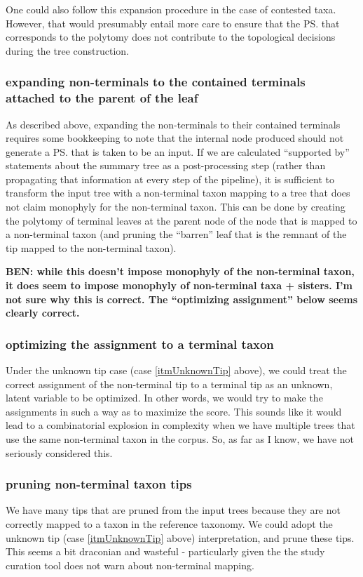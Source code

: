 \documentclass[11pt]{article}
\begin{document}
One could also follow this expansion procedure in the case of contested taxa.
However, that would presumably entail more care to ensure that the \ps that corresponds
    to the polytomy does not contribute to the topological decisions during the 
    tree construction.

\subsubsection{expanding non-terminals to the contained terminals attached to the parent of the leaf}\label{expandNonTermPar}
As described above, expanding the non-terminals to their contained terminals requires 
    some bookkeeping to note that the internal node produced should not generate a \ps that
    is taken to be an input.
If we are calculated ``supported by'' statements about the summary tree as a post-processing step (rather
    than propagating that information at every step of the pipeline), it is sufficient
    to transform the input tree with a non-terminal taxon mapping to a tree that does not
    claim monophyly for the non-terminal taxon.
This can be done by creating the polytomy of terminal leaves at the parent node of the node that is
    mapped to a non-terminal taxon (and pruning the ``barren'' leaf that is the remnant of the tip
    mapped to the non-terminal taxon).

    \textbf{BEN: while this doesn't impose monophyly of the non-terminal taxon, it does seem to impose monophyly of non-terminal taxa + sisters.  I'm not sure why this is correct.  The ``optimizing assignment'' below seems clearly correct.}

\subsubsection{optimizing the assignment to a terminal taxon}
Under the unknown tip case (case \ref{itmUnknownTip} above), we could treat the
    correct assignment of the non-terminal tip to a terminal tip as an
    unknown, latent variable to be optimized.
In other words, we would try to make the assignments in such a way as to
    maximize the \SWIPSD score.
This sounds like it would lead to a combinatorial explosion in complexity when 
    we have multiple trees that use the same non-terminal taxon in the corpus.
So, as far as I know, we have not seriously considered this.

\subsubsection{pruning non-terminal taxon tips}
We have many tips that are pruned from the input trees because they are 
    not correctly mapped to a taxon in the reference taxonomy.
We could adopt the unknown tip (case \ref{itmUnknownTip} above) interpretation,
    and prune these tips.
This seems a bit draconian and wasteful - particularly given the the study
    curation tool does not warn about non-terminal mapping.
\end{document}
